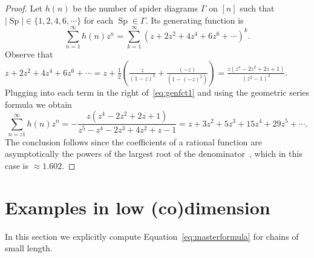 \documentclass[ALCO,ThmDefs,Unicode,epreuves]{cedram}
\DeclareMathOperator{\Sp}{Sp}
\newcommand{\D}{{\Gamma}}
\begin{document}
\begin{proof}
	Let $h(n)$ be the number of spider diagrams $\D$ on $[n]$ such that $|\Sp|\in\{1,2,4,6,\cdots\}$ for each $\Sp\in \D$. Its generating function is
	\begin{equation}\label{eq:genfct1}
	\sum_{n=1}^{\infty} h(n)z^n = \sum_{k=1}^{\infty}\left(z+2z^2+4z^4+6z^6+\cdots\right)^k.
	\end{equation}
	Observe that $z+2z^2+4z^4+6z^6+\cdots = z + \frac{1}{2}\left(\frac{z}{(1-z)^2}+\frac{(-z)}{(1-(-z)^2)}\right)=\frac{z(z^4-2z^2+2z+1)}{(z^2-1)^2}$. Plugging into each term in the right of~\eqref{eq:genfct1} and using the geometric series formula we obtain
	\begin{equation}\label{eq:genfct2}
	\sum_{n=z1}^{\infty} h(n)z^n = -\dfrac{z(z^4-2z^2+2z+1)}{z^5-z^4-2z^3+4z^2+z-1}=z+3z^2+5z^3+15z^4+29z^5+\cdots.
	\end{equation}
	The conclusion follows since the coefficients of a rational function are asymptotically the powers of the largest root of the denominator~\cite[Theorem~4.1.1]{ec2}, which in this case is $\approx 1.602$.
\end{proof}


\section{Examples in low (co)dimension}\label{sec:ex}
In this section we explicitly compute Equation~\eqref{eq:masterformula} for chains of small length.
\end{document}
